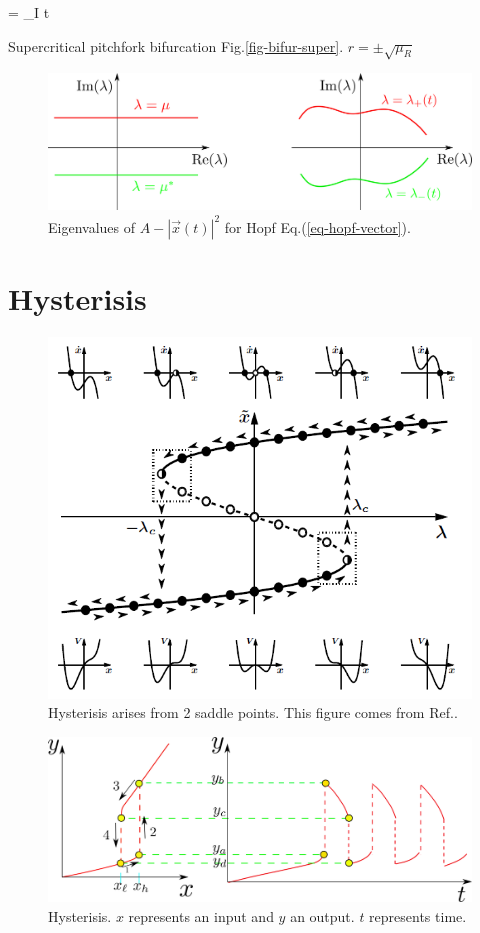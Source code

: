 \beq
\theta = \mu_I  t
\eeq

Supercritical pitchfork bifurcation Fig.\ref{fig-bifur-super}.
$r=\pm \sqrt{\mu_R}$

\begin{figure}[h!]
\centering
\includegraphics[width=5in]
{dynamical-sys/hopf-evas.png}
\caption{Eigenvalues of $A-|\vec{x}(t)|^2$ for Hopf
Eq.(\ref{eq-hopf-vector}).}
\label{fig-hopf}
\end{figure}

\section{Hysterisis}

\begin{figure}[h!]
 \centering
 \includegraphics[width=5in]
 {dynamical-sys/hysterisis-2-saddle-points.png}
 \caption{Hysterisis arises from 2 saddle points. This
 figure  comes from Ref.\cite{dynamical-fuchs}.}
 \label{fig-hysterisis-2-saddle-point}
 \end{figure}

 \begin{figure}[h!]
\centering
\includegraphics[width=5in]
{dynamical-sys/hysterisis.png}
\caption{Hysterisis. $x$ represents an input and $y$ an output. $t$ represents time.}
\label{fig-hysterisis}
\end{figure}

